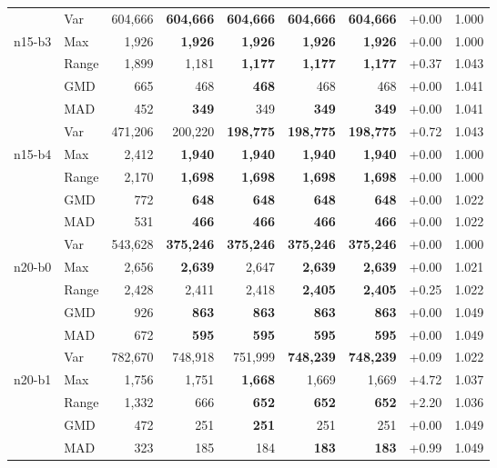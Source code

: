 \begin{small}
\begin{longtable}{llrrrrrrr}
 & Var & 604,666 & \textbf{604,666} & \textbf{604,666} & \textbf{604,666} & \textbf{604,666} & +0.00 & 1.000 \\
n15-b3 & Max & 1,926 & \textbf{1,926} & \textbf{1,926} & \textbf{1,926} & \textbf{1,926} & +0.00 & 1.000 \\
 & Range & 1,899 & 1,181 & \textbf{1,177} & \textbf{1,177} & \textbf{1,177} & +0.37 & 1.043 \\
 & GMD & 665 & 468 & \textbf{468} & 468 & 468 & +0.00 & 1.041 \\
 & MAD & 452 & \textbf{349} & 349 & \textbf{349} & \textbf{349} & +0.00 & 1.041 \\
 & Var & 471,206 & 200,220 & \textbf{198,775} & \textbf{198,775} & \textbf{198,775} & +0.72 & 1.043 \\
n15-b4 & Max & 2,412 & \textbf{1,940} & \textbf{1,940} & \textbf{1,940} & \textbf{1,940} & +0.00 & 1.000 \\
 & Range & 2,170 & \textbf{1,698} & \textbf{1,698} & \textbf{1,698} & \textbf{1,698} & +0.00 & 1.000 \\
 & GMD & 772 & \textbf{648} & \textbf{648} & \textbf{648} & \textbf{648} & +0.00 & 1.022 \\
 & MAD & 531 & \textbf{466} & \textbf{466} & \textbf{466} & \textbf{466} & +0.00 & 1.022 \\
 & Var & 543,628 & \textbf{375,246} & \textbf{375,246} & \textbf{375,246} & \textbf{375,246} & +0.00 & 1.000 \\
n20-b0 & Max & 2,656 & \textbf{2,639} & 2,647 & \textbf{2,639} & \textbf{2,639} & +0.00 & 1.021 \\
 & Range & 2,428 & 2,411 & 2,418 & \textbf{2,405} & \textbf{2,405} & +0.25 & 1.022 \\
 & GMD & 926 & \textbf{863} & \textbf{863} & \textbf{863} & \textbf{863} & +0.00 & 1.049 \\
 & MAD & 672 & \textbf{595} & \textbf{595} & \textbf{595} & \textbf{595} & +0.00 & 1.049 \\
 & Var & 782,670 & 748,918 & 751,999 & \textbf{748,239} & \textbf{748,239} & +0.09 & 1.022 \\
n20-b1 & Max & 1,756 & 1,751 & \textbf{1,668} & 1,669 & 1,669 & +4.72 & 1.037 \\
 & Range & 1,332 & 666 & \textbf{652} & \textbf{652} & \textbf{652} & +2.20 & 1.036 \\
 & GMD & 472 & 251 & \textbf{251} & 251 & 251 & +0.00 & 1.049 \\
 & MAD & 323 & 185 & 184 & \textbf{183} & \textbf{183} & +0.99 & 1.049 \\

\end{longtable}
\end{small}
